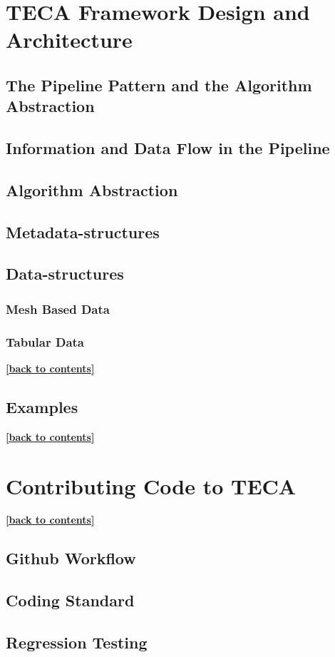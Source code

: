 \documentclass[a4paper,10pt,DIV=12]{scrreprt}
\begin{document}
\chapter{TECA Framework Design and Architecture}
\section{The Pipeline Pattern and the Algorithm Abstraction}
\section{Information and Data Flow in the Pipeline}
\section{Algorithm Abstraction}
\section{Metadata-structures}
\section{Data-structures}
\subsection{Mesh Based Data}
\subsection{Tabular Data}
\hyperlink{toc}{\footnotesize \bf [back to contents]}

\section{Examples}
\hyperlink{toc}{\footnotesize \bf [back to contents]}

\chapter{Contributing Code to TECA}
\hyperlink{toc}{\footnotesize \bf [back to contents]}
\section{Github Workflow}
\section{Coding Standard}
\section{Regression Testing}
\end{document}
